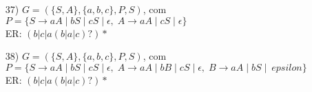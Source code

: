 \begin{enumerate}
    \item[37)] 
    $G = (\{S,A\}, \{a,b,c\}, P, S)$, com \\
    $P = \{ 
    S \to aA \mid bS \mid cS \mid \epsilon,\;
    A \to aA \mid cS \mid \epsilon \}$ \\[6pt]
    ER: $(b|c|a(b|a|c)?)*$

    \item[38)] 
    $G = (\{S,A\}, \{a,b,c\}, P, S)$, com \\
    $P = \{ 
    S \to aA \mid bS \mid cS \mid \epsilon,\;
    A \to aA \mid bB \mid cS \mid \epsilon,\;
    B \to aA \mid bS \mid \ epsilon \}$ \\[6pt]
    ER: $(b|c|a(b|a|c)?)*$
\end{enumerate}
